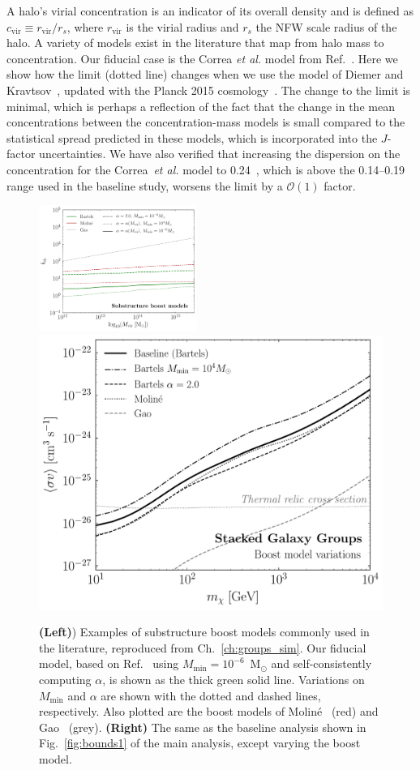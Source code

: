 A halo's virial concentration is an indicator of its overall density and is defined as $c_\text{vir} \equiv r_\text{vir}/r_s$, where $r_\text{vir}$ is the virial radius and $r_s$ the NFW scale radius of the halo.  A variety of models exist in the literature that map from halo mass to concentration.  Our fiducial case is the Correa \emph{et al.} model from Ref.~\cite{Correa:2015dva}.  Here we show how the limit (dotted line) changes when we use the model of Diemer and Kravtsov~\cite{Diemer:2014gba}, updated with the Planck 2015 cosmology~\cite{Ade:2015xua}.  The change to the limit is minimal, which is perhaps a reflection of the fact that the change in the mean concentrations between the concentration-mass models is small compared to the statistical spread predicted in these models, which is incorporated into the $J$-factor uncertainties.  We have also verified that increasing the dispersion on the concentration for the Correa~\emph{et al.} model to 0.24~\cite{Bullock:1999he}, which is above the 0.14--0.19 range used in the baseline study, worsens the limit by a $\mathcal{O}(1)$ factor.\vspace{0.1in}

\begin{figure}[t]
  \centering
  \includegraphics[width=0.46\textwidth]{ch-clusters/plots/boost_models_data.pdf} 
     \includegraphics[width=.45\textwidth]{ch-clusters/plots/systematics_boost.pdf}
  \caption{ \textbf{(Left)}) Examples of substructure boost models commonly used in the literature, reproduced from Ch.~\ref{ch:groups_sim}. Our fiducial model, based on Ref.~\cite{Bartels:2015uba} using $M_\text{min} = 10^{-6}$~M$_\odot$ and self-consistently computing $\alpha$, is shown as the thick green solid line. Variations on $M_\text{min}$ and $\alpha$ are shown with the dotted and dashed lines, respectively. Also plotted are the boost models of Molin\'e~\cite{Moline:2016pbm} (red) and Gao~\cite{Gao:2011rf} (grey).   \textbf{(Right)} The same as the baseline analysis shown in Fig.~\ref{fig:bounds1} of the main analysis, except varying the boost model.
  }
  \label{fig:systematics_boost}
\end{figure}

